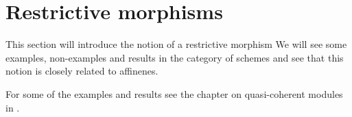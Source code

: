 \chapter{Restrictive morphisms}
This section will introduce the notion of a restrictive morphism
We will see some examples, non-examples and results in the category of schemes
and see that this notion is closely related to affinenes.

For some of the examples and results see the chapter on quasi-coherent modules in \cite{vakil}.










